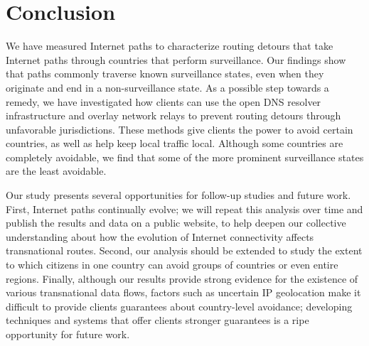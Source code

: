 \section{Conclusion}
\label{conclusion}

We have measured Internet paths to characterize routing
detours that take Internet paths through countries that perform
surveillance.  Our findings show that paths commonly traverse known
surveillance states, even when they originate and end in a
non-surveillance state.  As a possible step towards a remedy, we have
investigated how clients can use the open DNS resolver infrastructure
and overlay network relays to prevent routing detours through
unfavorable jurisdictions.  These methods give clients the power to
avoid certain countries, as well as help keep local traffic local.
Although some countries are completely avoidable, we find that some of
the more prominent surveillance states are the least avoidable.


Our study presents several opportunities for follow-up studies and
future work. First, Internet paths continually
evolve; we will repeat this analysis over time and publish the results
and data on a public website, to help deepen our collective
understanding about how the evolution of Internet connectivity affects
transnational routes. Second, our analysis should be extended to study
the extent to which citizens in one country can avoid groups of
countries or even entire regions. Finally, although our results provide strong 
evidence for the existence of various transnational data flows, factors
such as uncertain IP geolocation make it difficult to provide clients
guarantees about country-level avoidance; developing techniques and
systems that offer clients stronger guarantees
is a ripe opportunity for future work.
